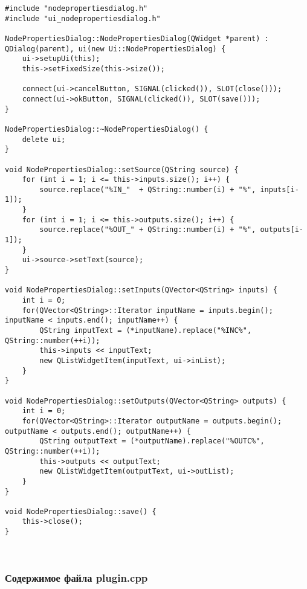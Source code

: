 \begin{lstlisting}
#include "nodepropertiesdialog.h"
#include "ui_nodepropertiesdialog.h"

NodePropertiesDialog::NodePropertiesDialog(QWidget *parent) : QDialog(parent), ui(new Ui::NodePropertiesDialog) {
    ui->setupUi(this);
    this->setFixedSize(this->size());

    connect(ui->cancelButton, SIGNAL(clicked()), SLOT(close()));
    connect(ui->okButton, SIGNAL(clicked()), SLOT(save()));
}

NodePropertiesDialog::~NodePropertiesDialog() {
    delete ui;
}

void NodePropertiesDialog::setSource(QString source) {
    for (int i = 1; i <= this->inputs.size(); i++) {
        source.replace("%IN_"  + QString::number(i) + "%", inputs[i-1]);
    }
    for (int i = 1; i <= this->outputs.size(); i++) {
        source.replace("%OUT_" + QString::number(i) + "%", outputs[i-1]);
    }
    ui->source->setText(source);
}

void NodePropertiesDialog::setInputs(QVector<QString> inputs) {
    int i = 0;
    for(QVector<QString>::Iterator inputName = inputs.begin(); inputName < inputs.end(); inputName++) {
        QString inputText = (*inputName).replace("%INC%", QString::number(++i));
        this->inputs << inputText;
        new QListWidgetItem(inputText, ui->inList);
    }
}

void NodePropertiesDialog::setOutputs(QVector<QString> outputs) {
    int i = 0;
    for(QVector<QString>::Iterator outputName = outputs.begin(); outputName < outputs.end(); outputName++) {
        QString outputText = (*outputName).replace("%OUTC%", QString::number(++i));
        this->outputs << outputText;
        new QListWidgetItem(outputText, ui->outList);
    }
}

void NodePropertiesDialog::save() {
    this->close();
}
\end{lstlisting}~\\

\subsubsection*{Содержимое файла plugin.cpp}

